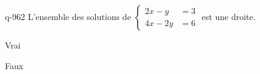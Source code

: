 \begin{truefalse}{q-962}
L'ensemble des solutions de $\begin{cases}2x-y &= 3 \\ 4x-2y &= 6\end{cases}$ est une droite.
\item* Vrai
\item Faux
\end{truefalse}

